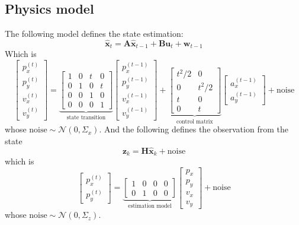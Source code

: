 \documentclass[12pt]{article}
\begin{document}
	\subsection{Physics model}\label{sub:model}
	The following model defines the state estimation:
	\begin{equation}
		\hat{\mathbf{x}}_t=\mathbf{A}\hat{\mathbf{x}}_{t-1}+\mathbf{B}\mathbf{u}_t+\mathbf{w}_{t-1}
	\end{equation}
	Which is
	\begin{equation}
		\begin{bmatrix}
			p^{(t)}_x \\ p^{(t)}_y \\ v^{(t)}_x \\ v^{(t)}_y
		\end{bmatrix}=
		\underbrace{\begin{bmatrix}
			1 & 0 & t & 0 \\
			0 & 1 & 0 & t \\
			0 & 0 & 1 & 0 \\
			0 & 0 & 0 & 1
		\end{bmatrix}}_{\text{state transition}}
		\begin{bmatrix}
			p^{(t-1)}_x \\ p^{(t-1)}_y \\ v^{(t-1)}_x \\ v^{(t-1)}_y
		\end{bmatrix}+
		\underbrace{\begin{bmatrix}
			t^2/2 & 0 \\
			0 & t^2/2 \\
			t & 0 \\
			0 & t
		\end{bmatrix}}_{\text{control matrix}}
		\begin{bmatrix}
			a^{(t-1)}_x \\ a^{(t-1)}_y
		\end{bmatrix}+\text{noise}
	\end{equation}
	whose $\text{noise}\sim\mathcal{N}\left(0,\Sigma_x\right)$. And the following defines the observation from the state
	\begin{equation}
		\mathbf{z}_k=\mathbf{H}\hat{\mathbf{x}}_k+\text{noise}
	\end{equation}
	which is
	\begin{equation}
		\begin{bmatrix}
			p^{(t)}_x \\ p^{(t)}_y
		\end{bmatrix}=
		\underbrace{\begin{bmatrix}
			1 & 0 & 0 & 0 \\
			0 & 1 & 0 & 0
		\end{bmatrix}}_{\text{estimation model}}
		\begin{bmatrix}
			p_x \\ p_y \\ v_x \\ v_y
		\end{bmatrix}+\text{noise}
	\end{equation}
	whose $\text{noise}\sim\mathcal{N}\left(0,\Sigma_z\right)$.
\end{document}
